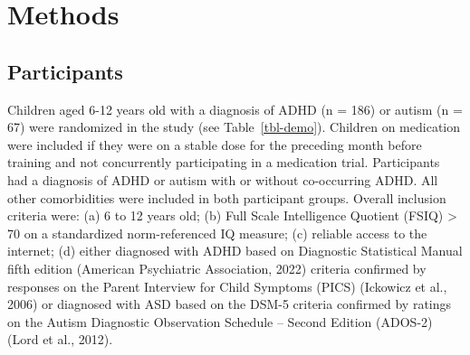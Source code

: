 \documentclass[
  letterpaper,
]{ut-thesis}
\begin{document}

\chapter{Methods}\label{methods}

\section{Participants}\label{participants}

Children aged 6-12 years old with a diagnosis of ADHD (n = 186) or
autism (n = 67) were randomized in the study (see Table~\ref{tbl-demo}).
Children on medication were included if they were on a stable dose for
the preceding month before training and not concurrently participating
in a medication trial. Participants had a diagnosis of ADHD or autism
with or without co-occurring ADHD. All other comorbidities were included
in both participant groups. Overall inclusion criteria were: (a) 6 to 12
years old; (b) Full Scale Intelligence Quotient (FSIQ) \textgreater{} 70
on a standardized norm-referenced IQ measure; (c) reliable access to the
internet; (d) either diagnosed with ADHD based on Diagnostic Statistical
Manual fifth edition (American Psychiatric Association, 2022) criteria
confirmed by responses on the Parent Interview for Child Symptoms (PICS)
(Ickowicz et al., 2006) or diagnosed with ASD based on the DSM-5
criteria confirmed by ratings on the Autism Diagnostic Observation
Schedule -- Second Edition (ADOS-2) (Lord et al., 2012).
\end{document}
